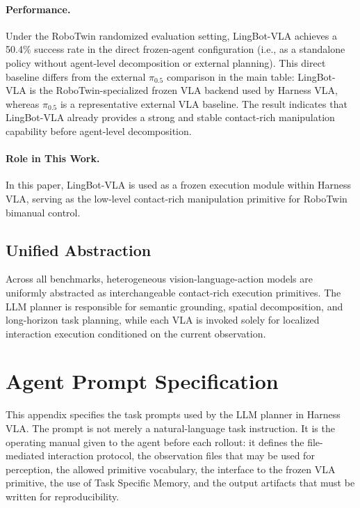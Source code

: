 \documentclass[11pt]{article}
\begin{document}
\paragraph{Performance.}
Under the RoboTwin randomized evaluation setting, LingBot-VLA achieves a 50.4\% success rate in the direct frozen-agent configuration (i.e., as a standalone policy without agent-level decomposition or external planning). This direct baseline differs from the external $\pi_{0.5}$ comparison in the main table: LingBot-VLA is the RoboTwin-specialized frozen VLA backend used by Harness VLA, whereas $\pi_{0.5}$ is a representative external VLA baseline. The result indicates that LingBot-VLA already provides a strong and stable contact-rich manipulation capability before agent-level decomposition.

\paragraph{Role in This Work.}
In this paper, LingBot-VLA is used as a frozen execution module within Harness VLA, serving as the low-level contact-rich manipulation primitive for RoboTwin bimanual control.

\subsection{Unified Abstraction}

Across all benchmarks, heterogeneous vision-language-action models are uniformly abstracted as interchangeable contact-rich execution primitives. The LLM planner is responsible for semantic grounding, spatial decomposition, and long-horizon task planning, while each VLA is invoked solely for localized interaction execution conditioned on the current observation.

\section{Agent Prompt Specification}
\label{app:agent_prompt}

This appendix specifies the task prompts used by the LLM planner in Harness VLA. The
prompt is not merely a natural-language task instruction. It is the operating manual
given to the agent before each rollout: it defines the file-mediated interaction
protocol, the observation files that may be used for perception, the allowed primitive
vocabulary, the interface to the frozen VLA primitive, the use of Task Specific Memory,
and the output artifacts that must be written for reproducibility.
\end{document}
